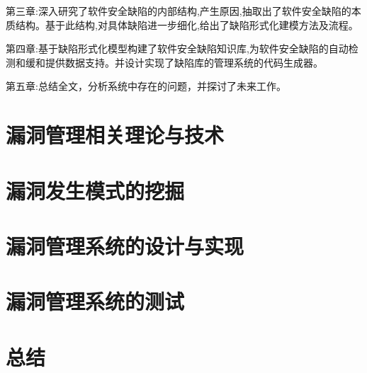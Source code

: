 \documentclass[a4paper]{ctexrep}
\begin{document}
		第三章:深入研究了软件安全缺陷的内部结构,产生原因,抽取出了软件安全缺陷的本质结构。基于此结构,对具体缺陷进一步细化,给出了缺陷形式化建模方法及流程。
		
		第四章:基于缺陷形式化模型构建了软件安全缺陷知识库,为软件安全缺陷的自动检测和缓和提供数据支持。并设计实现了缺陷库的管理系统的代码生成器。
		
		第五章:总结全文，分析系统中存在的问题，并探讨了未来工作。
	\chapter{漏洞管理相关理论与技术}
	\chapter{漏洞发生模式的挖掘}
	\chapter{漏洞管理系统的设计与实现}
	\chapter{漏洞管理系统的测试}
	\chapter{总结}

	
\end{document}
